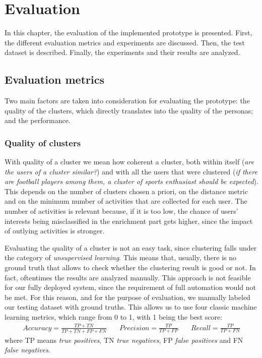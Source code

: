 \chapter{Evaluation}
\label{cha:evaluation}
In this chapter, the evaluation of the implemented prototype is presented. First, the different evaluation metrics and experiments are discussed. Then, the test dataset is described. Finally, the experiments and their results are analyzed.

\section{Evaluation metrics}
Two main factors are taken into consideration for evaluating the prototype: the quality of the clusters, which directly translates into the quality of the personas; and the performance.

\subsection{Quality of clusters}
With quality of a cluster we mean how coherent a cluster, both within itself (\textit{are the users of a cluster similar?}) and with all the users that were clustered (\textit{if there are football players among them, a cluster of sports enthusiast should be expected}). This depends on the number of clusters chosen a priori, on the distance metric and on the minimum number of activities that are collected for each user. The number of activities is relevant because, if it is too low, the chance of users' interests being misclassified in the enrichment part gets higher, since the impact of outlying activities is stronger. 

Evaluating the quality of a cluster is not an easy task, since clustering falls under the category of \textit{unsupervised learning}. This means that, usually, there is no ground truth that allows to check whether the clustering result is good or not. In fact, oftentimes the results are analyzed manually. This approach is not feasible for our fully deployed system, since the requirement of full automation would not be met. For this reason, and for the purpose of evaluation, we manually labeled our testing dataset with ground truths. This allows us to use four classic machine learning metrics, which range from 0 to 1, with 1 being the best score:
\begin{equation*}
    \begin{split}
        Accuracy = \frac{TP + TN}{TP + TN + FP + FN}
    \end{split}
    \quad
    \begin{split}
        Precision = \frac{TP}{TP + FP}
    \end{split}
    \quad
    \begin{split}
        Recall = \frac{TP}{TP + FN}
    \end{split}
\end{equation*}
where TP means \textit{true positives}, TN \textit{true negatives}, FP \textit{false positives} and FN \textit{false negatives}.
